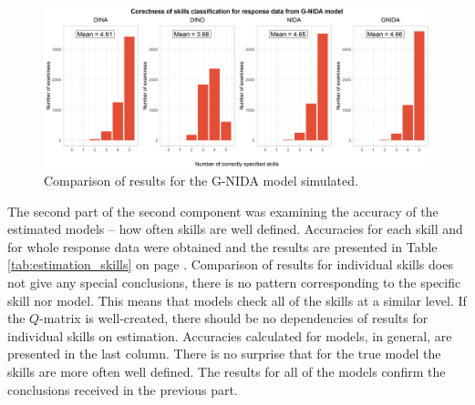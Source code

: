\documentclass[english]{pwr_wmat_praca_dyplomowa}
\theoremstyle{plain}
\numberwithin{theorem}{chapter}
\theoremstyle{definition}
\numberwithin{theorem}{chapter}
\begin{document}
	\begin{figure}[h!]
		\centering
		\includegraphics[width=\textwidth]{GNIDA_skills_classification_col.png}
		\caption{Comparison of results for the G-NIDA model simulated.}
		\label{comparison_gnida}
	\end{figure}
	
	The second part of the second component was examining the accuracy of the estimated models -- how often skills are well defined. Accuracies for each skill and for whole response data were obtained and the results are presented in Table \ref{tab:estimation_skills} on page \pageref{tab:estimation_skills}. Comparison of results for individual skills does not give any special conclusions, there is no pattern corresponding to the specific skill nor model. This means that models check all of the skills at a similar level. If the $Q$-matrix is well-created, there should be no dependencies of results for individual skills on estimation. Accuracies calculated for models, in general, are presented in the last column. There is no surprise that for the true model the skills are more often well defined. The results for all of the models confirm the conclusions received in the previous part.
	
\end{document}
